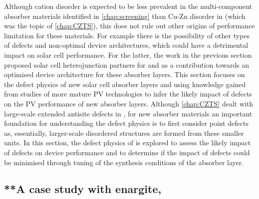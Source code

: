 \documentclass[11pt, twoside]{report}
\begin{document}
Although cation disorder is expected to be less prevalent in the multi-component absorber materials identified in \autoref{chap:screening} than Cu-Zn disorder in {\CZTS} (which was the topic of \autoref{chap:CZTS}), this does not rule out other origins of performance limitation for these materials. For example there is the possibility of other types of defects and non-optimal device architectures, which could have a detrimental impact on solar cell performance. For the latter, the work in the previous section proposed solar cell heterojunction partners for {\enargite} and {\bournonite} as a contribution towards an optimised device architecture for these absorber layers. This section focuses on the defect physics of new solar cell absorber layers and using knowledge gained from studies of more mature PV technologies to infer the likely impact of defects on the PV performance of new absorber layers. Although \autoref{chap:CZTS} dealt with large-scale extended antisite defects in {\CZTS}, for new absorber materials an important foundation for understanding the defect physics is to first consider point defects as, essentially, larger-scale disordered structures are formed from these smaller units. In this section, the defect physics of {\enargite} is explored to assess the likely impact of defects on device performance and to determine if the impact of defects could be minimised through tuning of the synthesis conditions of the absorber layer.


\subsection{**A case study with enargite, {\enargite}}\label{enargite_defects}
\end{document}
